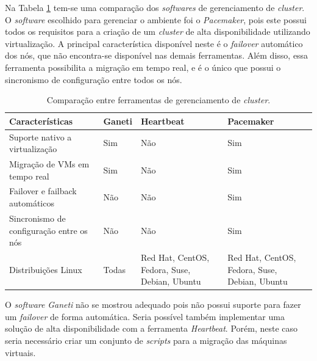 Na Tabela \ref{tab:clusterger} tem-se uma comparação dos \textit{softwares} de gerenciamento de \textit{cluster}. 
O \textit{software} escolhido para gerenciar o ambiente foi o \textit{Pacemaker}, pois este possui todos os requisitos para a criação de um 
\textit{cluster} de alta disponibilidade utilizando virtualização. A principal característica disponível neste é o \textit{failover} automático
dos nós, que não encontra-se disponível nas demais ferramentas. Além disso, essa ferramenta possibilita a migração em tempo real, 
e é o único que possui o sincronismo de configuração entre todos os nós. 

\begin{table}[h!]
\caption{Comparação entre ferramentas de gerenciamento de \textit{cluster}.}
\label{tab:clusterger}
\begin{center}
\begin{tabular}{|p{4cm}|p{2cm}|p{3.5cm}|p{3.5cm}|}\hline
\textbf{Características} & \textbf{Ganeti} & \textbf{Heartbeat} & \textbf{Pacemaker} \\\hline
Suporte nativo a virtualização & Sim & Não & Sim \\\hline
Migração de \acp{VM} em tempo real & Sim & Não & Sim \\\hline
Failover e failback automáticos & Não & Não & Sim \\\hline
Sincronismo de configuração entre os nós & Não & Não & Sim \\\hline
Distribuições Linux & Todas & Red Hat, CentOS, Fedora, Suse, Debian, Ubuntu & Red Hat, CentOS, Fedora, Suse, Debian, Ubuntu \\\hline
\end{tabular}
\end{center}
\end{table}

O \textit{software} \textit{Ganeti} não se mostrou adequado pois não possui suporte para fazer um \textit{failover} de forma automática. 
Seria possível também implementar uma solução de alta disponibilidade com a ferramenta \textit{Heartbeat}. Porém, neste caso seria necessário 
criar um conjunto de \textit{scripts} para a migração das máquinas virtuais.



